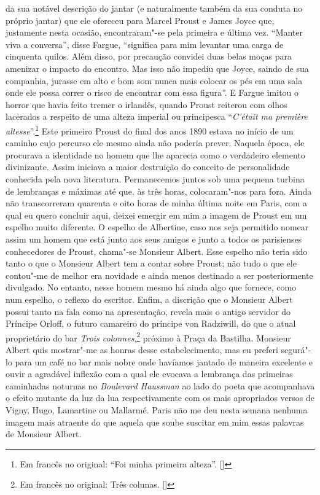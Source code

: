 da sua notável descrição do jantar (e naturalmente também da sua conduta
no próprio jantar) que ele ofereceu para Marcel Proust e James Joyce que,
justamente nesta ocasião, encontraram"-se pela primeira e última vez.
``Manter viva a conversa'', disse Fargue, ``significa para mim levantar
uma carga de cinquenta quilos. Além disso, por precaução convidei duas
belas moças para amenizar o impacto do encontro. Mas isso não impediu
que Joyce, saindo de sua companhia, jurasse em alto e bom som nunca mais
colocar os pés em uma sala onde ele possa correr o risco de encontrar
com essa figura''. E Fargue imitou o horror que havia feito tremer o
irlandês, quando Proust reiterou com olhos lacerados a respeito de uma
alteza imperial ou principesca ``\emph{C'était ma première altesse}''.\footnote{Em francês no original: ``Foi minha primeira alteza''. []} Este primeiro Proust do final dos
anos 1890 estava no início de um caminho cujo percurso ele mesmo ainda
não poderia prever. Naquela época, ele procurava a identidade no homem que lhe
aparecia como o verdadeiro elemento divinizante. Assim iniciava
a maior destruição do conceito de personalidade conhecida pela nova
literatura. Permanecemos juntos sob uma pequena turbina de lembranças
e máximas até que, às três horas, colocaram"-nos para fora. Ainda não
transcorreram quarenta e oito horas de minha última noite em Paris, com
a qual eu quero concluir aqui, deixei emergir em mim a imagem de Proust
em um espelho muito diferente. O espelho de Albertine, caso nos seja
permitido nomear assim um homem que está junto aos seus amigos e junto a
todos os parisienses conhecedores de Proust, chama"-se Monsieur Albert.
Esse espelho não teria sido tanto o que o Monsieur Albert tem a contar
sobre Proust; não tudo o que ele contou"-me de melhor era novidade e
ainda menos destinado a ser posteriormente divulgado. No entanto, nesse
homem mesmo há ainda algo que fornece, como num espelho, o reflexo do
escritor. Enfim, a discrição que o Monsieur Albert possui tanto na fala
como na apresentação, revela mais o antigo servidor do Príncipe Orloff,
o futuro camareiro do príncipe von Radziwill, do que o atual
proprietário do bar \emph{Trois colonnes},\footnote{Em francês no original: Três colunas. []} próximo à Praça da Bastilha.
Monsieur Albert quis mostrar"-me as honras desse estabelecimento, mas eu
preferi segurá"-lo para um café no bar mais nobre onde havíamos jantado
de maneira excelente e ouvir a agradável inflexão com a qual ele evocava
a lembrança das primeiras caminhadas noturnas no \emph{Boulevard
Haussman} ao lado do poeta que acompanhava o efeito mutante da luz da
lua respectivamente com os mais apropriados versos de Vigny, Hugo,
Lamartine ou Mallarmé. Paris não me deu nesta semana nenhuma imagem mais
atraente do que aquela que soube suscitar em mim essas palavras de
Monsieur Albert.
